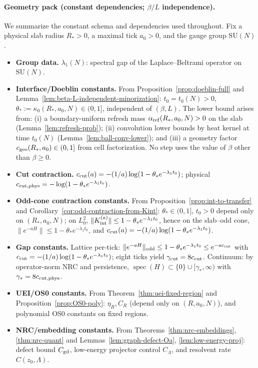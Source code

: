 \documentclass[11pt]{amsart}
\theoremstyle{plain}
\theoremstyle{definition}
\theoremstyle{remark}
\begin{document}
\paragraph{Geometry pack (constant dependencies; $\beta/L$ independence).}\label{para:geometry-pack}
We summarize the constant schema and dependencies used throughout. Fix a physical slab radius $R_*>0$, a maximal tick $a_0>0$, and the gauge group $\mathrm{SU}(N)$.
\begin{itemize}
  \item \textbf{Group data.} $\lambda_1(N)$: spectral gap of the Laplace--Beltrami operator on $\mathrm{SU}(N)$.
  \item \textbf{Interface/Doeblin constants.} From Proposition~\ref{prop:doeblin-full} and Lemma~\ref{lem:beta-L-independent-minorization}:
  $t_0=t_0(N)>0$, $\theta_*:=\kappa_0(R_*,a_0,N)\in(0,1]$, independent of $(\beta,L)$. The lower bound arises from: (i) a boundary-uniform refresh mass $\alpha_{\rm ref}(R_*,a_0,N)>0$ on the slab (Lemma~\ref{lem:refresh-prob}); (ii) convolution lower bounds by heat kernel at time $t_0(N)$ (Lemma~\ref{lem:ball-conv-lower}); and (iii) a geometry factor $c_{\rm geo}(R_*,a_0)\in(0,1]$ from cell factorization. No step uses the value of $\beta$ other than $\beta\ge 0$.
  \item \textbf{Cut contraction.} $c_{\rm cut}(a)=-(1/a)\log(1-\theta_* e^{-\lambda_1 t_0})$; physical $c_{\rm cut,phys}=-\log(1-\theta_* e^{-\lambda_1 t_0})$.
  \item \textbf{Odd-cone contraction constants.} From Proposition~\ref{prop:int-to-transfer} and Corollary~\ref{cor:odd-contraction-from-Kint}:
  $\theta_*\in(0,1]$, $t_0>0$ depend only on $(R_*,a_0,N)$; on $L^2_0$,
  $\|K_{\rm int}^{(a)}\|\le 1-\theta_* e^{-\lambda_1 t_0}$, hence on the slab--odd cone, $\|e^{-aH}\|\le 1-\theta_* e^{-\lambda_1 t_0}$, and $c_{\rm cut}(a)=-(1/a)\log(1-\theta_* e^{-\lambda_1 t_0})$.
  \item \textbf{Gap constants.} Lattice per-tick: $\|e^{-aH}\|_{\rm odd}\le 1-\theta_* e^{-\lambda_1 t_0}\le e^{-a c_{\rm cut}}$ with $c_{\rm cut}=-(1/a)\log(1-\theta_* e^{-\lambda_1 t_0})$; eight ticks yield $\gamma_{\rm cut}=8 c_{\rm cut}$. Continuum: by operator-norm NRC and persistence, $\operatorname{spec}(H)\subset\{0\}\cup[\gamma_*,\infty)$ with $\gamma_*=8 c_{\rm cut,phys}$.
  \item \textbf{UEI/OS0 constants.} From Theorem~\ref{thm:uei-fixed-region} and Proposition~\ref{prop:OS0-poly}: $\eta_R, C_R$ (depend only on $(R,a_0,N)$), and polynomial OS0 constants on fixed regions.
  \item \textbf{NRC/embedding constants.} From Theorems~\ref{thm:nrc-embeddings}, \ref{thm:nrc-quant} and Lemmas~\ref{lem:graph-defect-Oa}, \ref{lem:low-energy-proj}: defect bound $C_{\rm gd}$, low-energy projector control $C_\Lambda$, and resolvent rate $C(z_0,\Lambda)$.
\end{itemize}
\end{document}
